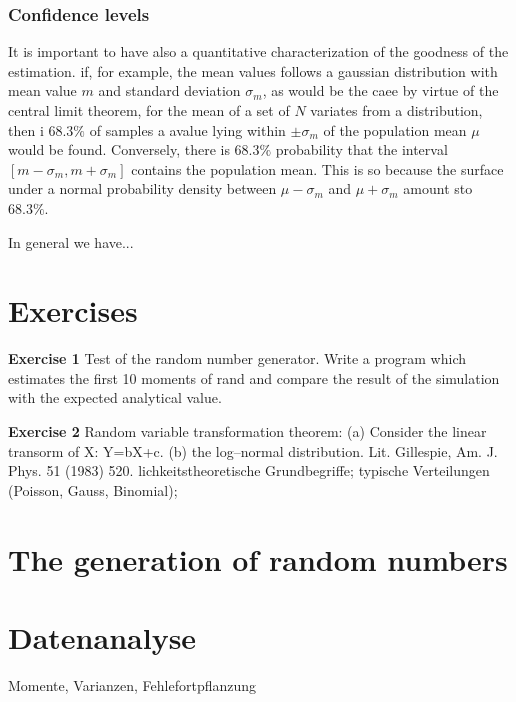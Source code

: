 \subsubsection{Confidence levels}
It is important to have also a quantitative characterization of the
goodness of the estimation. if, for example, the mean values follows a
gaussian distribution with mean value $m$ and standard deviation
$\sigma_m$,
as would be the caee by virtue of the central limit theorem, for the
mean of a set of $N$ variates from a distribution, then i $68.3 \%$ of
samples a avalue lying within $\pm \sigma_m$  of the population mean
$\mu$ would be found. Conversely, there is $68.3 \%$ probability that
the interval $[m-\sigma_m, m+\sigma_m]$ contains the population mean.
This is so because the surface under a normal probability density
between  $\mu-\sigma_m$ and $\mu + \sigma_m$ amount sto $68.3 \%$.

In general we have...










\section{Exercises}
{\bf Exercise 1} Test of the random number generator. Write a 
program which estimates the first 10 moments of rand and compare 
the result of the simulation with the expected analytical value.

{\bf Exercise 2} Random variable transformation theorem: (a) Consider 
the linear transorm of X: Y=bX+c. (b) the log--normal 
distribution.
Lit. Gillespie, Am. J. Phys. 51 (1983) 520.
lichkeitstheoretische Grundbegriffe; typische 
Verteilungen (Poisson, Gauss, Binomial); 

\section{The generation of random numbers}

\section{Datenanalyse}
Momente, Varianzen, Fehlefortpflanzung
